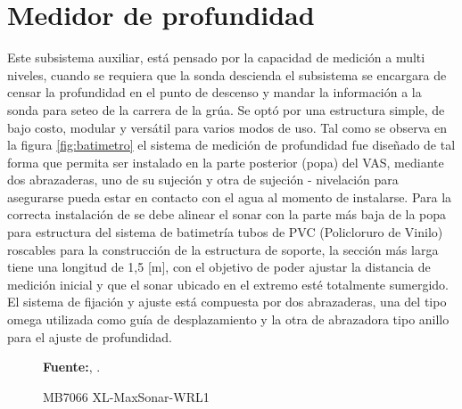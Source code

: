 \section{Medidor de profundidad}
Este subsistema auxiliar, está pensado por la capacidad de medici\'on a multi niveles, cuando se requiera que la sonda descienda el subsistema se encargara de censar la profundidad en el punto de descenso y mandar la informaci\'on a la sonda para seteo de la carrera de la gr\'ua. Se opt\'o por una estructura simple, de bajo costo,  modular y vers\'atil para varios modos de uso.  
Tal como se observa en la figura \ref{fig:batimetro} el sistema de medici\'on de profundidad fue dise\~nado de tal forma que permita ser instalado en la parte posterior (popa) del VAS, mediante dos abrazaderas, uno de su sujeci\'on y otra de sujeci\'on - nivelaci\'on para asegurarse  pueda estar en contacto con el agua al momento de instalarse.  Para la correcta  instalaci\'on de se debe alinear el sonar con la parte m\'as baja de la popa para estructura del sistema de batimetr\'ia tubos de PVC (Policloruro de Vinilo) roscables para la construcci\'on de la estructura de soporte, la secci\'on m\'as larga tiene una longitud de 1,5 [m], con el objetivo de poder ajustar la distancia de medici\'on inicial y que el sonar ubicado en el extremo est\'e totalmente sumergido. El sistema de fijaci\'on y ajuste est\'a compuesta por dos abrazaderas, una del tipo omega utilizada como gu\'ia de desplazamiento y la otra de abrazadora tipo anillo para el ajuste de profundidad. 
\begin{figure}[H]
\centering
{}
\caption{MB7066 XL-MaxSonar-WRL1}{\textbf{Fuente:}, \cite{maxbotix-inc-2019}}.
\label{fig:torneado}
\end{figure}

